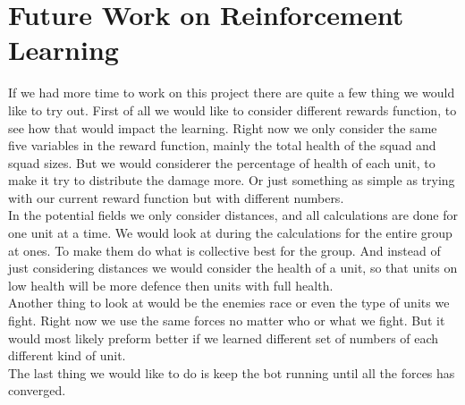 \section{Future Work on Reinforcement Learning}
%

If we had more time to work on this project there are quite a few thing we would like to try out. First of all we would like to consider different rewards function, to see how that would impact the learning. Right now we only consider the same five variables in the reward function, mainly the total health of the squad and squad sizes. But we would considerer the percentage of health of each unit, to make it try to distribute the damage more. Or just something as simple as trying with our current reward function but with different numbers. \\

In the potential fields we only consider distances, and all calculations are done for one unit at a time. We would look at during the calculations for the entire group at ones. To make them do what is collective best for the group. And instead of just considering distances we would consider the health of a unit, so that units on low health will be more defence then units with full health.\\

Another thing to look at would be the enemies race or even the type of units we fight. Right now we use the same forces no matter who or what we fight. But it would most likely preform better if we learned different set of numbers of each different kind of unit.\\

The last thing we would like to do is keep the bot running until all the forces has converged.